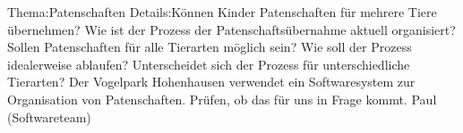 
%
	{Thema:}{Patenschaften}%
	{Details:}{Können Kinder Patenschaften für mehrere Tiere übernehmen? \newline Wie ist der Prozess der Patenschaftsübernahme aktuell organisiert? \newline Sollen Patenschaften für alle Tierarten möglich sein? \newline Wie soll der Prozess idealerweise ablaufen? \newline Unterscheidet sich der Prozess für unterschiedliche Tierarten? \newline Der Vogelpark Hohenhausen verwendet ein Softwaresystem zur Organisation von Patenschaften. Prüfen, ob das für uns in Frage kommt.}%
	{Paul (Softwareteam)}
